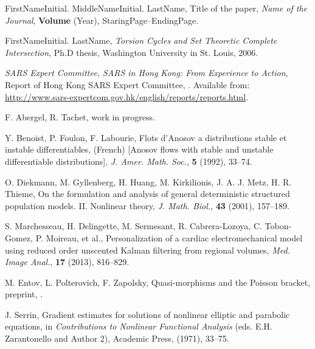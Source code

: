 \documentclass{mbe}
\numberwithin{equation}{section}
\begin{document}
\begin{thebibliography}{99}

     \newblock  FirstNameInitial.  MiddleNameInitial. LastName, %
     \newblock Title of the paper,
     \newblock \emph{Name of the Journal}, \textbf{Volume} (Year), StaringPage--EndingPage.

    \newblock FirstNameInitial. LastName,
    \newblock  \emph{Torsion Cycles and Set Theoretic Complete Intersection},
    \newblock  Ph.D thesis, Washington University in St. Louis, 2006.

\newblock\emph{SARS Expert Committee, SARS in Hong Kong: From Experience to
Action}, Report of Hong Kong SARS Expert Committee,
. Available from: \url{http://www.sars-expertcom.gov.hk/english/reports/reports.html}.

\newblock F. Abergel, R. Tachet,
\newblock
\newblock work in progress.

    \newblock Y. Benoist, P. Foulon, F. Labourie, %
    \newblock Flots d'Anosov a distributions stable et instable
     differentiables,
    \newblock (French) [Anosov flows with stable and unstable differentiable
     distributions], \emph{J. Amer. Math. Soc.}, \textbf{5} (1992), 33--74.

\newblock  O. Diekmann, M. Gyllenberg, H. Huang, M. Kirkilionis, J. A. J. Metz, H. R. Thieme, 
\newblock On the formulation and analysis of general deterministic structured population models. II. Nonlinear theory, 
\emph{J. Math. Biol.}, \textbf{43} (2001), 157--189.

\newblock S. Marchesseau, H. Delingette, M. Sermesant, R. Cabrera-Lozoya, C. Tobon-Gomez, P. Moireau, et al., 
\newblock Personalization of a cardiac electromechanical model using reduced order unscented Kalman filtering from regional volumes, \emph{Med. Image Anal.}, \textbf{17} (2013), 816--829.

\newblock M. Entov, L. Polterovich, F. Zapolsky,
\newblock Quasi-morphisms and the Poisson bracket,
\newblock preprint, .

    \newblock J. Serrin,
    \newblock  Gradient estimates for solutions of nonlinear elliptic
                     and parabolic equations,
    \newblock  in \emph{Contributions to Nonlinear Functional Analysis} (eds. E.H. Zarantonello and Author 2),
                Academic Press, (1971), 33--75.


\end{thebibliography}
\end{document}
